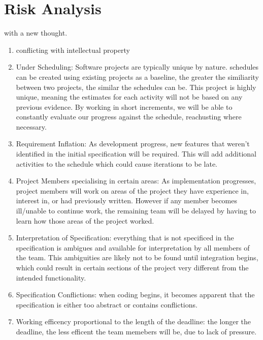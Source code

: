 \chapter[Risk Analysis]{Risk Analysis}
\label{ch:jobs}


 with a new thought.

\begin{enumerate}
\item
conflicting with intellectual property

\item
Under Scheduling:
Software projects are typically unique by nature.
schedules can be created using existing projects as a baseline, the greater the similiarity between two projects, the similar the schedules can be.
This project is highly unique, meaning the estimates for each activity will not be based on any previous evidence.
By working in short increments, we will be able to constantly evaluate our progress against the schedule, reachusting where necessary.

\item
Requirement Inflation:
As development progress, new features that weren't identified in the initial specification will be required.
This will add additional activities to the schedule which could cause iterations to be late.

\item
Project Members specialising in certain areas:
As implementation progresses, project members will work on areas of the project they have experience in, interest in, or had previously written.
However if any member becomes ill/unable to continue work, the remaining team will be delayed by having to learn how those areas of the project worked.

\item
Interpretation of Specification:
everything that is not specificed in the specification is ambigues and available for interpretation by all members of the team.
This ambiguities are likely not to be found until integration begins, which could result in certain sections of the project very different from the intended functionality.

\item
Specification Conflictions:
when coding begins, it becomes apparent that the specification is either too abstract or contains conflictions.

\item
Working efficency proportional to the length of the deadline:
the longer the deadline, the less efficent the team memebers will be, due to lack of pressure.

\end{enumerate}
